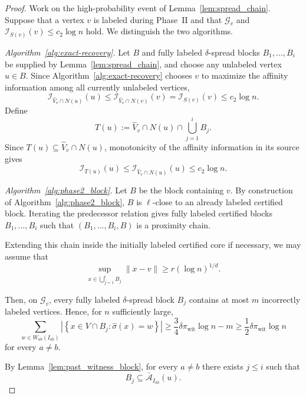 \documentclass[11pt, a4paper]{amsart}
\newcommand{\1}{\mathbf{1}}
\theoremstyle{definition}
\theoremstyle{remark}
\theoremstyle{definition}
\begin{document}
\begin{proof}
Work on the high-probability event of
Lemma~\ref{lem:spread_chain}. Suppose that a vertex $v$ is labeled
during Phase~II and that $\mathcal G_v$ and $\mathcal I_{S(v)}(v)\le c_2\log n$
hold. We distinguish the two algorithms.

\medskip
\noindent
\emph{Algorithm~\ref{alg:exact-recovery}.}
Let $B$ and fully labeled $\delta$-spread blocks
$B_1,\ldots,B_i$ be supplied by
Lemma~\ref{lem:spread_chain}, and choose any unlabeled vertex
$u\in B$.
Since Algorithm~\ref{alg:exact-recovery} chooses $v$ to maximize
the affinity information among all currently unlabeled vertices,
\[
\mathcal I_{\widehat V_v\cap N(u)}(u)
\le
\mathcal I_{\widehat V_v\cap N(v)}(v)
=
\mathcal I_{S(v)}(v)
\le
c_2\log n.
\]
Define
\[
T(u)
:=
\widehat V_v\cap N(u)
\cap
\bigcup_{j=1}^i B_j.
\]
Since $T(u)\subseteq \widehat V_v\cap N(u)$, monotonicity of the affinity information in its source gives
\[
\mathcal I_{T(u)}(u)
\le
\mathcal I_{\widehat V_v\cap N(u)}(u)
\le
c_2\log n.
\]

\medskip
\noindent
\emph{Algorithm~\ref{alg:phase2_block}.}
Let $B$ be the block containing $v$. By construction of
Algorithm~\ref{alg:phase2_block}, $B$ is $\ell$-close to an already
labeled certified block. Iterating the predecessor relation gives
fully labeled certified blocks $B_1,\ldots,B_i$ such that
$(B_1,\ldots,B_i,B)$ is a proximity chain.

Extending this chain inside the initially labeled certified core if
necessary, we may assume that
\[
\sup_{x\in\bigcup_{j=1}^i B_j}\|x-v\|
\ge r(\log n)^{1/d}.
\]

Then, on $\mathcal G_v$, every fully labeled $\delta$-spread block
$B_j$ contains at most $m$ incorrectly labeled vertices. Hence, for
$n$ sufficiently large,
\[
\sum_{w\in W_{ab}(I_{ab})}
\left|
\left\{
x\in V\cap B_j:
\widehat\sigma(x)=w
\right\}
\right|
\geq
\frac34\delta\pi_{\mathrm{wit}}\log n-m
\geq
\frac12\delta\pi_{\mathrm{wit}}\log n
\]
for every $a\neq b$.

By Lemma~\ref{lem:past_witness_block}, for every $a\neq b$ there
exists $j\leq i$ such that
\[
B_j\subseteq\bar{\mathcal A}_{I_{ab}}(u).
\]


\end{proof}
\end{document}
